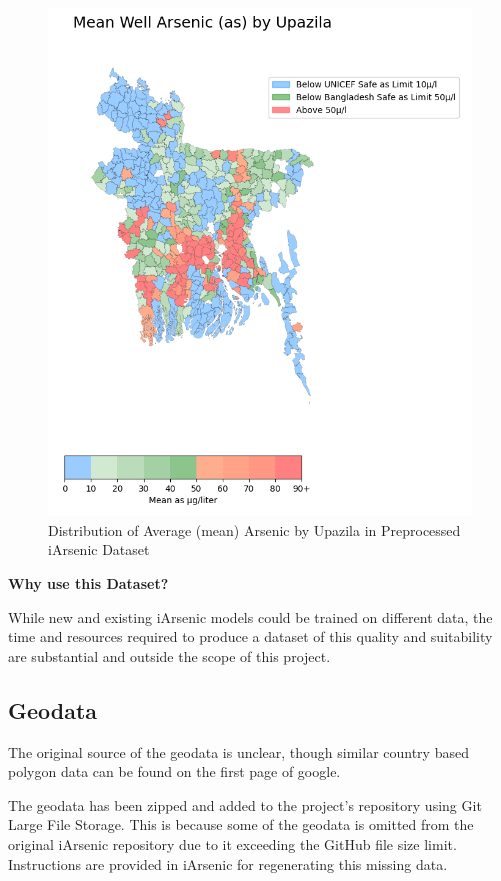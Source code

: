\begin{figure}[!htb]
    \centering
    \includegraphics[scale=0.6]{figures/mean_as_by_upazila.png} 
    \caption{Distribution of Average (mean) Arsenic by Upazila in Preprocessed iArsenic Dataset}
    \label{fig:x avg_as}
\end{figure}

\newpage

\textbf{Why use this Dataset?}

While new and existing iArsenic models could be trained on different data, the time and resources required to produce a dataset of this quality and suitability are substantial and outside the scope of this project. 

\subsection{Geodata}

The original source of the geodata is unclear, though similar country based polygon data can be found on the first page of google.

The geodata has been zipped and added to the project's repository using Git Large File Storage. This is because some of the geodata is omitted from the original iArsenic repository due to it exceeding the GitHub file size limit. Instructions are provided in iArsenic for regenerating this missing data.

